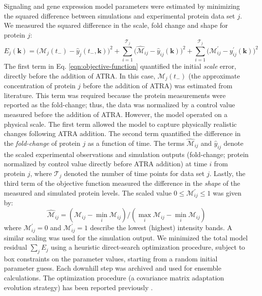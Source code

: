 \documentclass[12pt]{article}
\begin{document}
Signaling and gene expression model parameters were estimated by minimizing the squared difference between simulations and experimental protein data set $j$.
We measured the squared difference in the scale, fold change and shape for protein $j$:
\begin{equation}\label{eqn:objective-function}
	E_{j}(\mathbf{k}) = \biggl(\mathcal{M}_{j}\left(t_{-}\right)-\hat{y}_{j}\left(t_{-},\mathbf{k}\right)\biggr)^2+\sum_{i=1}^{\mathcal{T}_{j}}\biggl(\hat{\mathcal{M}}_{ij}-\hat{y}_{ij}(\mathbf{k})\biggr)^2 + \sum_{i=1}^{\mathcal{T}_{j}}\biggl(\mathcal{M}^{\prime}_{ij}-y^{\prime}_{ij}(\mathbf{k})\biggr)^2
\end{equation}
The first term in Eq. \eqref{eqn:objective-function} quantified the initial \textit{scale} error, directly before the addition of ATRA.
In this case, $\mathcal{M}_{j}\left(t_{-}\right)$ (the approximate concentration of protein $j$ before the addition of ATRA) was estimated from literature.
This term was required because the protein measurements were reported as the fold-change; thus, the data was normalized by a control
value measured before the addition of ATRA. However, the model operated on a physical scale.
The first term allowed the model to capture physically realistic changes following ATRA addition.
The second term quantified the difference in the \textit{fold-change} of protein $j$ as a function of time.
The terms $\hat{\mathcal{M}}_{ij}$ and $\hat{y}_{ij}$ denote the scaled experimental observations and simulation outputs (fold-change; protein normalized by control value directly before ATRA addition)
at time $i$ from protein $j$,
where $\mathcal{T}_{j}$ denoted the number of time points for data set $j$.
Lastly, the third term of the objective function measured the difference in the \textit{shape} of the measured and simulated protein levels.
The scaled value $0\leq\mathcal{M}^{\prime}_{ij}\leq{1}$ was given by:
\begin{equation}\label{norm_exp_data}
\hat{\mathcal{M}}_{ij} = \left({\mathcal{M}_{ij} - \min_{i}\mathcal{M}_{ij}}\right)/\left({\max_{i}{\mathcal{M}_{ij}}-\min_{i}{\mathcal{M}_{ij}}}\right)
\end{equation}
where $\mathcal{M}^{\prime}_{ij}=0$ and $\mathcal{M}^{\prime}_{ij}=1$  describe the lowest (highest) intensity bands.
A similar scaling was used for the simulation output.
We minimized the total model residual $\sum_{j}E_{j}$ using a heuristic direct-search optimization procedure, subject to box constraints on the parameter values,
starting from a random initial parameter guess. Each downhill step was archived and used for ensemble calculations.
The optimization procedure (a covariance matrix adaptation evolution strategy) has been reported previously \cite{Igel:2007aa}.
\end{document}
